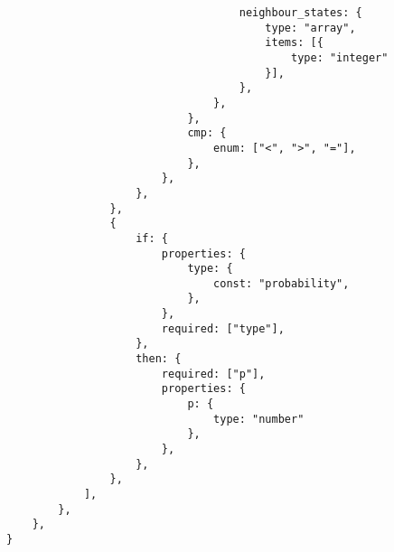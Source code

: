 \begin{verbatim}
                                    neighbour_states: {
                                        type: "array",
                                        items: [{
                                            type: "integer"
                                        }],
                                    },
                                },
                            },
                            cmp: {
                                enum: ["<", ">", "="],
                            },
                        },
                    },
                },
                {
                    if: {
                        properties: {
                            type: {
                                const: "probability",
                            },
                        },
                        required: ["type"],
                    },
                    then: {
                        required: ["p"],
                        properties: {
                            p: {
                                type: "number"
                            },
                        },
                    },
                },
            ],
        },
    },
}
\end{verbatim}

